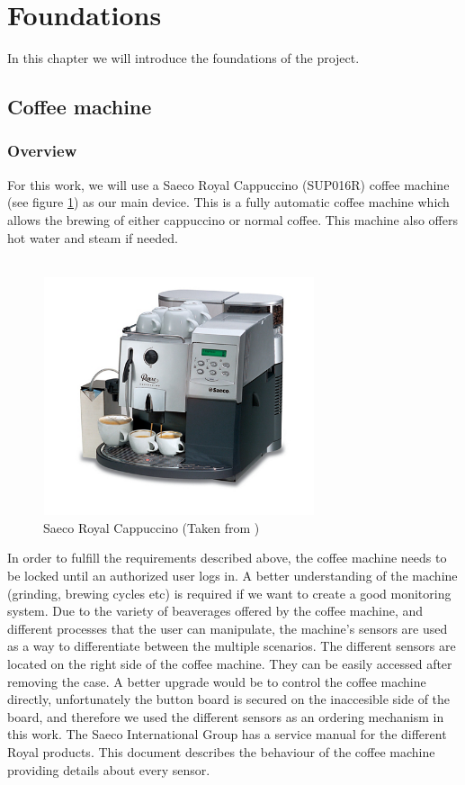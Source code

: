 \documentclass[12pt]{article}
\begin{document}
  \section{Foundations}
  In this chapter we will introduce the foundations of the project.
  \subsection{Coffee machine}
  \subsubsection{Overview}
  For this work, we will use a Saeco Royal Cappuccino (SUP016R) coffee machine (see figure \ref{fig:coffeeMachine}) as our main device. 
  This is a fully automatic coffee machine which allows the brewing of either cappuccino or normal coffee. 
  This machine also offers hot water and steam if needed.\\~\\
  \begin{figure}[h]
   \centering
   \includegraphics[width=8cm, height=7cm]{./images/coffeeMachine}
   \captionsetup{justification=centering}
   \caption{Saeco Royal Cappuccino (Taken from \cite{SaecoPic})}
   \label{fig:coffeeMachine}
  \end{figure}
  In order to fulfill the requirements described above, the coffee machine needs to be locked until an authorized user logs in.
  A better understanding of the machine (grinding, brewing cycles etc) is required if we want to create a good monitoring system.
  Due to the variety of beaverages offered by the coffee machine, and different processes that the user can manipulate, 
  the machine's sensors are used as a way to differentiate between the multiple scenarios.
  The different sensors are located on the right side of the coffee machine. They can be easily accessed after removing the case.
  A better upgrade would be to control the coffee machine directly, unfortunately the button board is secured on the inaccesible side of the board, and
  therefore we used the different sensors as an ordering mechanism in this work. The Saeco International Group has a service manual\cite{Saeco} for the different Royal products.
  This document describes the behaviour of the coffee machine providing details about every sensor.
  \newpage
\end{document}
